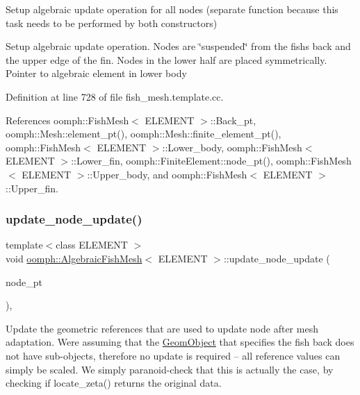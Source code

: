 Setup algebraic update operation for all nodes (separate function because this task needs to be performed by both constructors) 

Setup algebraic update operation. Nodes are \char`\"{}suspended\char`\"{} from the fish\textquotesingle{}s back and the upper edge of the fin. Nodes in the lower half are placed symmetrically. Pointer to algebraic element in lower body 

Definition at line 728 of file fish\+\_\+mesh.\+template.\+cc.



References oomph\+::\+Fish\+Mesh$<$ E\+L\+E\+M\+E\+N\+T $>$\+::\+Back\+\_\+pt, oomph\+::\+Mesh\+::element\+\_\+pt(), oomph\+::\+Mesh\+::finite\+\_\+element\+\_\+pt(), oomph\+::\+Fish\+Mesh$<$ E\+L\+E\+M\+E\+N\+T $>$\+::\+Lower\+\_\+body, oomph\+::\+Fish\+Mesh$<$ E\+L\+E\+M\+E\+N\+T $>$\+::\+Lower\+\_\+fin, oomph\+::\+Finite\+Element\+::node\+\_\+pt(), oomph\+::\+Fish\+Mesh$<$ E\+L\+E\+M\+E\+N\+T $>$\+::\+Upper\+\_\+body, and oomph\+::\+Fish\+Mesh$<$ E\+L\+E\+M\+E\+N\+T $>$\+::\+Upper\+\_\+fin.

\mbox{\label{classoomph_1_1AlgebraicFishMesh_a4f992939c299f87abc762c14aab50b5c}} 
\subsubsection{\texorpdfstring{update\+\_\+node\+\_\+update()}{update\_node\_update()}}
{\footnotesize\ttfamily template$<$class E\+L\+E\+M\+E\+NT $>$ \\
void \hyperlink{classoomph_1_1AlgebraicFishMesh}{oomph\+::\+Algebraic\+Fish\+Mesh}$<$ E\+L\+E\+M\+E\+NT $>$\+::update\+\_\+node\+\_\+update (\begin{DoxyParamCaption}\item[{\hyperlink{classoomph_1_1AlgebraicNode}{Algebraic\+Node} $\ast$\&}]{node\+\_\+pt }\end{DoxyParamCaption})\hspace{0.3cm}{\ttfamily [inline]}, {\ttfamily [virtual]}}



Update the geometric references that are used to update node after mesh adaptation. We\textquotesingle{}re assuming that the \hyperlink{classoomph_1_1GeomObject}{Geom\+Object} that specifies the fish back does not have sub-\/objects, therefore no update is required -- all reference values can simply be scaled. We simply paranoid-\/check that this is actually the case, by checking if locate\+\_\+zeta() returns the original data. 

